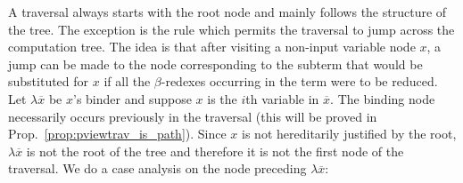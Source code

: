 A traversal always starts with the root node and mainly follows the
structure of the tree. The exception is the  rule
which permits the traversal to jump across the computation tree. The
idea is that after visiting a non-input variable node $x$, a jump
can be made to the node corresponding to the subterm that would be
substituted for $x$ if all the $\beta$-redexes occurring in the term
were to be reduced. Let $\lambda \overline{x}$ be $x$'s binder and
suppose $x$ is the $i$th variable in $\overline{x}$. The binding
node necessarily occurs previously in the traversal (this will be
proved in Prop.\ \ref{prop:pviewtrav_is_path}). Since $x$ is not
hereditarily justified by the root, $\lambda \overline{x}$ is not
the root of the tree and therefore it is not the first node of the
traversal. We do a case analysis on the node preceding $\lambda
\overline{x}$:

